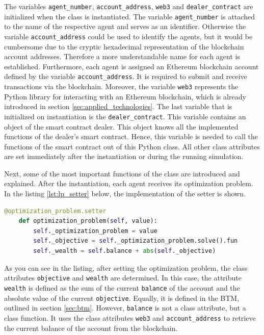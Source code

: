 The variables \verb|agent_number|, \verb|account_address|, \verb|web3| and \verb|dealer_contract| are initialized when the class is instantiated.
The variable \verb|agent_number| is attached to the name of the respective agent and serves as an identifier. 
Otherwise the variable \verb|account_address| could be used to identify the agents, 
but it would be cumbersome due to the cryptic hexadecimal representation of the blockchain account addresses.
Therefore a more understandable name for each agent is established.
Furthermore, each agent is assigned an Ethereum blockchain account defined by the variable \verb|account_address|. It is required to submit and 
receive transactions via the blockchain.
Moreover, the variable \verb|web3| represents the Python library for interacting with an Ethereum blockchain, which is already introduced in section \ref{sec:applied_technologies}.
The last variable that is initialized on instantiation is the \verb|dealer_contract|. 
This variable contains an object of the smart contract dealer. This object knows all the implemented functions of the dealer's smart contract.
Hence, this variable is needed to call the functions of the smart contract out of this Python class.
All other class attributes are set immediately after the instantiation or during the running simulation. 

Next, some of the most important functions of the class are introduced and explained.
After the instantiation, each agent receives its optimization problem. 
In the listing \ref{lst:lp_setter} below, the implementation 
of the setter is shown.

\begin{lstlisting}[label=lst:lp_setter, caption=Setter of optimization problem, language=Python]
    @optimization_problem.setter
    def optimization_problem(self, value):
        self._optimization_problem = value
        self._objective = self._optimization_problem.solve().fun
        self._wealth = self.balance + abs(self._objective)
\end{lstlisting}

As you can see in the listing, after setting the optimization problem, the class attributes \verb|objective| and \verb|wealth| are determined.
In this case, the attribute \verb|wealth| is defined as the sum of the current \verb|balance| of the account and the absolute value of the current \verb|objective|.
Equally, it is defined in the BTM, outlined in section \ref{sec:btm}.
However, \verb|balance| is not a class attribute, but a class function. It uses the class attributes \verb|web3| and \verb|account_address| to retrieve the current
balance of the account from the blockchain.

